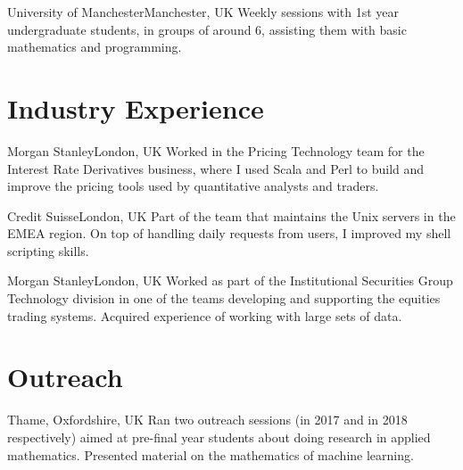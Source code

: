 \documentclass[11pt,a4paper,roman]{moderncv} %
\begin{document}
        {University of Manchester}{Manchester, UK}{}
        {
          Weekly sessions with 1st year 
          undergraduate students, in groups of around 6,
          assisting them with basic mathematics and programming.
        }


\section{Industry Experience}

        {Morgan Stanley}{London, UK}{}
        {
          Worked in the Pricing Technology team for the Interest 
          Rate Derivatives business, where I used Scala and Perl 
          to build and improve the pricing tools used 
          by quantitative analysts and traders. 
        }

        {Credit Suisse}{London, UK}{}
        {
          Part of the team that maintains the Unix servers in the 
          EMEA region. On top of handling daily requests from users, 
          I improved my shell scripting skills.
        }

        {Morgan Stanley}{London, UK}{}
        {
          Worked as part of the Institutional Securities Group Technology 
          division in one of the teams developing and supporting the equities 
          trading systems. Acquired experience of working with large sets of data.
        }

\section{Outreach}

        {Thame, Oxfordshire, UK}{}{}
        {
          Ran two outreach sessions (in 2017 and in 2018 respectively) 
          aimed at pre-final year 
          students about doing research in applied mathematics.
          Presented material on the mathematics of machine learning.
        }

\end{document}
